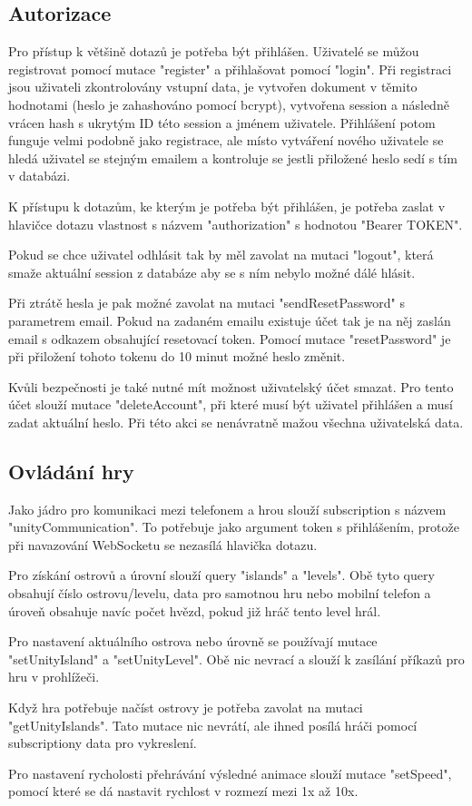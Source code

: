 \subsection{Autorizace}
Pro přístup k většině dotazů je potřeba být přihlášen. Uživatelé se můžou registrovat pomocí mutace "register" a přihlašovat pomocí "login". Při registraci jsou uživateli zkontrolovány vstupní data, je vytvořen dokument v těmito hodnotami (heslo je zahashováno pomocí bcrypt\cite{bcrypt}), vytvořena session a následně vrácen hash s ukrytým ID této session a jménem uživatele. Přihlášení potom funguje velmi podobně jako registrace, ale místo vytváření nového uživatele se hledá uživatel se stejným emailem a kontroluje se jestli přiložené heslo sedí s tím v databázi.\par
K přístupu k dotazům, ke kterým je potřeba být přihlášen, je potřeba zaslat v hlavičce dotazu vlastnost s názvem "authorization" s hodnotou "Bearer TOKEN".\par
Pokud se chce uživatel odhlásit tak by měl zavolat na mutaci "logout", která smaže aktuální session z databáze aby se s ním nebylo možné dálé hlásit.\par
Při ztrátě hesla je pak možné zavolat na mutaci "sendResetPassword" s parametrem email. Pokud na zadaném emailu existuje účet tak je na něj zaslán email s odkazem obsahující resetovací token. Pomocí mutace "resetPassword" je při přiložení tohoto tokenu do 10 minut možné heslo změnit.\par
Kvůli bezpečnosti je také nutné mít možnost uživatelský účet smazat. Pro tento účet slouží mutace "deleteAccount", při které musí být uživatel přihlášen a musí zadat aktuální heslo. Při této akci se nenávratně mažou všechna uživatelská data.

\subsection{Ovládání hry}
Jako jádro pro komunikaci mezi telefonem a hrou slouží subscription s názvem "unityCommunication". To potřebuje jako argument token s přihlášením, protože při navazování WebSocketu se nezasílá hlavička dotazu.\par
Pro získání ostrovů a úrovní slouží query "islands" a "levels". Obě tyto query obsahují číslo ostrovu/levelu, data pro samotnou hru nebo mobilní telefon a úroveň obsahuje navíc počet hvězd, pokud již hráč tento level hrál.\par
Pro nastavení aktuálního ostrova nebo úrovně se používají mutace "setUnityIsland" a "setUnityLevel". Obě nic nevrací a slouží k zasílání příkazů pro hru v prohlížeči.\par
Když hra potřebuje načíst ostrovy je potřeba zavolat na mutaci "getUnityIslands". Tato mutace nic nevrátí, ale ihned posílá hráči pomocí subscriptiony data pro vykreslení.\par
Pro nastavení rycholosti přehrávání výsledné animace slouží mutace "setSpeed", pomocí které se dá nastavit rychlost v rozmezí mezi 1x až 10x.

